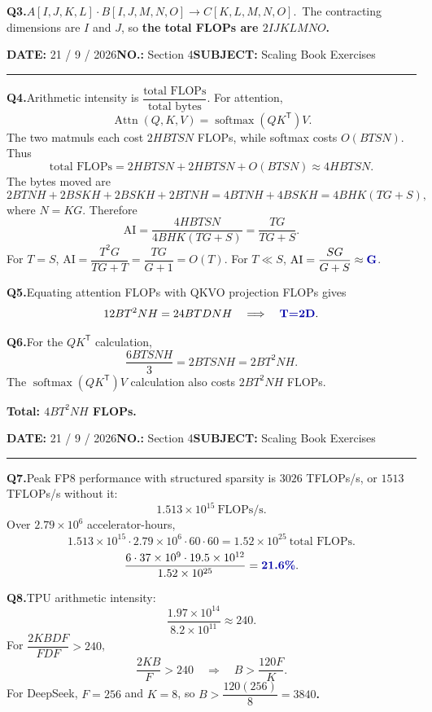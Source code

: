 \documentclass[10pt]{article}
\newcommand{\answer}[1]{\textcolor{blue!65!black}{\textbf{#1}}}
\newcommand{\question}[1]{\par\vspace{0.9em}\noindent\textbf{#1}\quad}
\newcommand{\meta}[2]{\textbf{#1} #2\hspace{2.5em}}
\newcommand{\pagehead}[2]{%
 {\small\meta{DATE:}{#1}\meta{NO.:}{#2}\meta{SUBJECT:}{Scaling Book Exercises}}\par\vspace{0.8em}\hrule\vspace{0.8em}}
\begin{document}
\question{Q3.}$A[I,J,K,L]\cdot B[I,J,M,N,O]\longrightarrow C[K,L,M,N,O]$.\
The contracting dimensions are $I$ and $J$, so \answer{the total FLOPs are $2IJKLMNO$.}

\newpage
\pagehead{21 / 9 / 2026}{Section 4}
\question{Q4.}Arithmetic intensity is $\dfrac{\text{total FLOPs}}{\text{total bytes}}$.  For attention,
\[
\operatorname{Attn}(Q,K,V)=\operatorname{softmax}(QK^\mathsf{T})V.
\]
The two matmuls each cost $2HBTSN$ FLOPs, while softmax costs $O(BTSN)$.  Thus
\[
\text{total FLOPs}=2HBTSN+2HBTSN+O(BTSN)\approx4HBTSN.
\]
The bytes moved are
\[
2BTNH+2BSKH+2BSKH+2BTNH
=4BTNH+4BSKH
=4BHK(TG+S),
\]
where $N=KG$.  Therefore
\[
\mathrm{AI}=\frac{4HBTSN}{4BHK(TG+S)}=\frac{TG}{TG+S}.
\]
For $T=S$, $\mathrm{AI}=\dfrac{T^2G}{TG+T}=\dfrac{TG}{G+1}=O(T)$.  For $T\ll S$, $\mathrm{AI}=\dfrac{SG}{G+S}\approx\answer{G}$.

\question{Q5.}Equating attention FLOPs with QKVO projection FLOPs gives
\[
12BT^2NH=24BTDNH
\quad\Longrightarrow\quad \answer{T=2D}.
\]

\question{Q6.}For the $QK^\mathsf{T}$ calculation,
\[
\frac{6BTSNH}{3}=2BTSNH=2BT^2NH.
\]
The $\operatorname{softmax}(QK^\mathsf{T})V$ calculation also costs $2BT^2NH$ FLOPs.\
\begin{center}\answer{Total: $4BT^2NH$ FLOPs.}\end{center}

\newpage
\pagehead{21 / 9 / 2026}{Section 4}
\question{Q7.}Peak FP8 performance with structured sparsity is $3026$ TFLOPs/s, or $1513$ TFLOPs/s without it:
\[
1.513\times10^{15}\ \mathrm{FLOPs/s}.
\]
Over $2.79\times10^6$ accelerator-hours,
\[
1.513\times10^{15}\cdot2.79\times10^6\cdot60\cdot60
=1.52\times10^{25}\ \text{total FLOPs}.
\]
\[
\frac{6\cdot37\times10^9\cdot19.5\times10^{12}}{1.52\times10^{25}}
=\answer{21.6\%}.
\]

\question{Q8.}TPU arithmetic intensity:
\[
\frac{1.97\times10^{14}}{8.2\times10^{11}}\approx240.
\]
For $\dfrac{2KBDF}{FDF}>240$,
\[
\frac{2KB}{F}>240
\quad\Longrightarrow\quad B>\frac{120F}{K}.
\]
For DeepSeek, $F=256$ and $K=8$, so \answer{$B>\dfrac{120(256)}8=3840$.}
\end{document}
